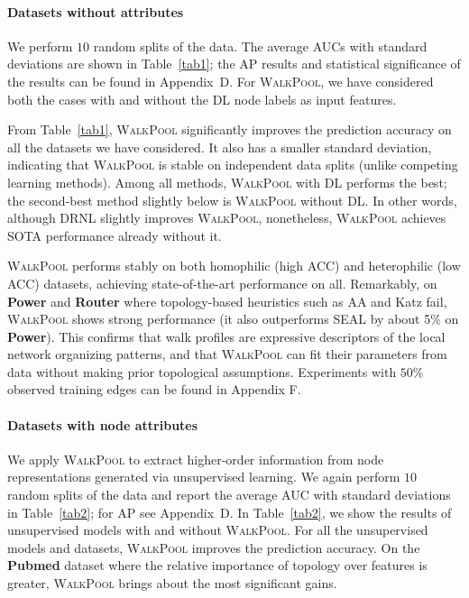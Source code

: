 \documentclass[11pt]{article}
\newcommand{\walkpool}{\textsc{WalkPool}\xspace}
\newcommand{\UPDATE}[1]{\textcolor{WowColor}{{#1}}}
\newcounter{margincounter}
\newcommand{\displaycounter}{{\arabic{margincounter}}}
\newcommand{\incdisplaycounter}{{\stepcounter{margincounter}\arabic{margincounter}}}
\newcommand{\fTBD}[1]{\textcolor{SubtleColor}{$\,^{(\incdisplaycounter)}$}\marginnote{\tiny\textcolor{SubtleColor}{ {\tiny $(\displaycounter)$} #1}}}
\renewcommand{\fTBD}[1]{}
\renewcommand{\UPDATE}[1]{#1}
\begin{document}
\paragraph{Datasets without attributes} We perform $10$ random splits of the data. The average AUCs with standard deviations are shown in Table~\ref{tab1}; the AP results \UPDATE{and statistical significance of the results} can be found in Appendix~D.\fTBD{Are these reference to appendices correct? Why are they hard coded?} For \walkpool, we have considered both the cases with and without the DL node labels\fTBD{has this been defined?} as input features. 

From Table~\ref{tab1}, \walkpool significantly improves the prediction accuracy on all the datasets we have considered. It also has a smaller standard deviation, indicating that \walkpool is stable on independent data splits (unlike competing learning methods). Among all methods, \walkpool with DL performs the best; the second-best method slightly below is \walkpool without DL. \UPDATE{In other words, although DRNL slightly improves \walkpool, nonetheless, \walkpool achieves SOTA performance already without it.}

\walkpool performs stably on both homophilic (high ACC) and heterophilic (low ACC) datasets, achieving  state-of-the-art performance on all. Remarkably, on \textbf{Power} and \textbf{Router} where topology-based heuristics such as AA and Katz fail, \walkpool shows strong performance (it also outperforms SEAL by about 5\% on \textbf{Power}). This confirms that walk profiles are expressive descriptors of the local network organizing patterns, and that \walkpool can fit their parameters from data without making prior topological assumptions. \UPDATE{Experiments with $50\%$ observed training edges can be found in Appendix F.}
\vspace{-2mm}
\paragraph{Datasets with node attributes} 
We apply \walkpool to extract higher-order information from node representations generated via unsupervised learning. We again perform $10$ random splits of the data and report the average AUC with standard deviations in Table~\ref{tab2}; for AP see Appendix~D. In Table~\ref{tab2}, we show the results of unsupervised models with and without \walkpool. For all the unsupervised models and datasets, \walkpool improves the prediction accuracy. On the \textbf{Pubmed} dataset where the relative importance of topology over features is greater, \walkpool brings about the most significant gains.
\end{document}
